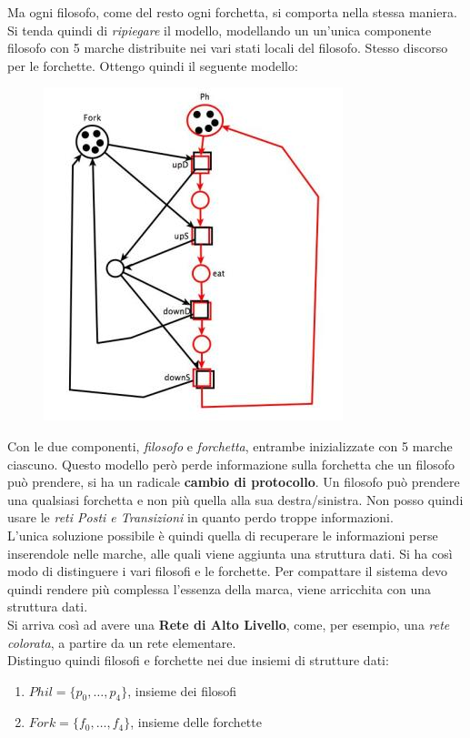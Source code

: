 \documentclass[a4paper,12pt, oneside]{book}
\begin{document}
Ma ogni filosofo, come del resto ogni forchetta, si comporta nella stessa
maniera. Si tenda quindi di \textit{ripiegare} il modello, modellando un
un'unica componente filosofo con 5 marche distribuite nei vari stati locali del
filosofo. Stesso discorso per le forchette. Ottengo quindi il seguente modello:
\begin{figure}[H]
  \centering
  \includegraphics[scale = 0.6]{img/pt16.jpg}
\end{figure}
Con le due componenti, \textit{filosofo} e \textit{forchetta}, entrambe
inizializzate con 5 marche ciascuno. Questo modello però perde informazione
sulla forchetta che un filosofo può prendere, si ha un radicale \textbf{cambio
  di protocollo}. Un filosofo può prendere una qualsiasi forchetta e non più
quella alla sua destra/sinistra. Non posso quindi usare le \textit{reti Posti e
  Transizioni} in quanto perdo troppe informazioni.\\
L'unica soluzione possibile è quindi quella di recuperare le informazioni perse
inserendole nelle marche, alle quali viene aggiunta una struttura dati. Si ha
così modo di distinguere i vari filosofi e le forchette. Per compattare il
sistema devo quindi rendere più complessa l'essenza della marca, viene
arricchita con una struttura dati.\\
Si arriva così ad avere una \textbf{Rete di Alto Livello}, come, per esempio,
una \textit{rete colorata}, a partire da un rete elementare.\\
Distinguo quindi filosofi e forchette nei due insiemi di strutture dati:
\begin{enumerate}
  \item $Phil=\{p_0,\ldots, p_4\}$, insieme dei filosofi
  \item $Fork=\{f_0,\ldots, f_4\}$, insieme delle forchette
\end{enumerate}
\end{document}
